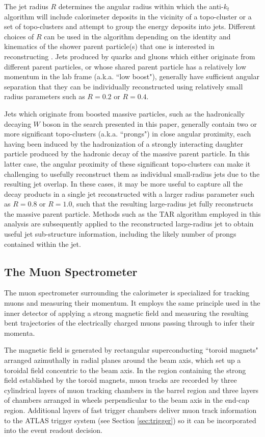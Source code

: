 The jet radius \(R\) determines the angular radius within which the anti-\(k_t\) algorithm will include calorimeter deposits in the vicinity of a topo-cluster or a set of topo-clusters and attempt to group the energy deposits into jets. Different choices of \(R\) can be used in the algorithm depending on the identity and kinematics of the shower parent particle(s) that one is interested in reconstructing \cite{jet_reco}. Jets produced by quarks and gluons which either originate from different parent particles, or whose shared parent particle has a relatively low momentum in the lab frame (a.k.a. ``low boost"), generally have sufficient angular separation that they can be individually reconstructed using relatively small radius parameters such as \(R=0.2\) or \(R=0.4\). 

Jets which originate from boosted massive particles, such as the hadronically decaying \(W\) boson in the search presented in this paper, generally contain two or more significant topo-clusters (a.k.a. ``prongs") in close angular proximity, each having been induced by the hadronization of a strongly interacting daughter particle produced by the hadronic decay of the massive parent particle. In this latter case, the angular proximity of these significant topo-clusters can make it challenging to usefully reconstruct them as individual small-radius jets due to the resulting jet overlap. In these cases, it may be more useful to capture all the decay products in a single jet reconstructed with a larger radius parameter such as \(R=0.8\) or \(R=1.0\), such that the resulting large-radius jet fully reconstructs the massive parent particle. Methods such as the TAR algorithm \cite{TAR_algo} employed in this analysis are subsequently applied to the reconstructed large-radius jet to obtain useful jet sub-structure information, including the likely number of prongs contained within the jet.

\subsection{The Muon Spectrometer}
\label{sec:muon_spec}

The muon spectrometer \cite{atlas} surrounding the calorimeter is specialized for tracking muons and measuring their momentum. It employs the same principle used in the inner detector of applying a strong magnetic field and measuring the resulting bent trajectories of the electrically charged muons passing through to infer their momenta. 

The magnetic field is generated by rectangular superconducting ``toroid magnets" arranged azimuthally in radial planes around the beam axis, which set up a toroidal field concentric to the beam axis. In the region containing the strong field established by the toroid magnets, muon tracks are recorded by three cylindrical layers of muon tracking chambers in the barrel region and three layers of chambers arranged in wheels perpendicular to the beam axis in the end-cap region. Additional layers of fast trigger chambers deliver muon track information to the ATLAS trigger system (see Section \ref{sec:trigger}) so it can be incorporated into the event readout decision. 

